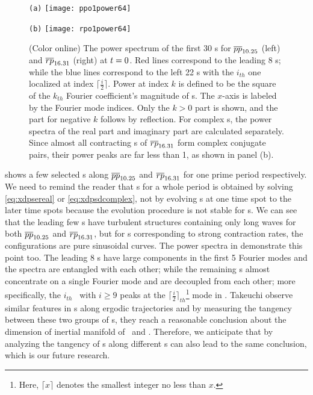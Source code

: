 \documentclass[final,leqno,onefignum,onetabnum]{siamltexmm}
\begin{document}
\begin{figure}[h]
  \centering
  \begin{minipage}{.47\textwidth}
    \centering \small{\texttt{(a)}}
    \texttt{[image: ppo1power64]}
  \end{minipage}
  \begin{minipage}{.47\textwidth}
    \centering \small{\texttt{(b)}}
    \texttt{[image: rpo1power64]}
  \end{minipage}
  \caption{(Color online)
    The power spectrum of the first 30 \Fv s for ${\overline{pp}}_{10.25}$
    (left) and ${\overline{rp}}_{16.31}$ (right)
    at $t=0$. Red lines correspond to the leading 8 \Fv s; while
    the blue lines correspond to the left 22 \Fv s with the $i_{th}$ one
    {localized at index $\lceil \frac{i}{2} \rceil$.
    Power at index $k$ is defined to be the square of the $k_{th}$
    Fourier coefficient's magnitude
    of \Fv s}.
    The $x$-axis is
    labeled by the Fourier mode indices.
    Only the $k>0$ part is shown, and the part for
    negative $k$ follows by reflection. For complex \Fv s, the
    power spectra of the real part and imaginary part are calculated
    separately. Since almost all contracting \Fv s of ${\overline{rp}}_{16.31}$
    form complex conjugate pairs, their power peaks are far less than 1,
    {as shown in panel (b)}.
  }
  \label{fig:FVpower}
\end{figure}
 shows a few selected \Fv s along ${\overline{pp}}_{10.25}$
and ${\overline{rp}}_{16.31}$ for one prime period respectively. We need to
remind the reader that \Fv s for a whole period is obtained by solving
\eqref{eq:xdpsereal} or \eqref{eq:xdpsdcomplex}, not by evolving
\Fv s at one time spot to the later time spots because the evolution
procedure is not stable  for \Fv s. We can see that the leading
few \Fv s have turbulent structures containing only long waves
for both ${\overline{pp}}_{10.25}$ and ${\overline{rp}}_{16.31}$, but for
\Fv s corresponding to strong contraction rates, the configurations
are pure sinusoidal curves. The power spectra in 
demonstrate this point too. The leading 8 \Fv s have large components in
the first 5 Fourier modes and the spectra are entangled with each other;
while the remaining \Fv s almost concentrate
on a single Fourier mode and are decoupled from each other;
more specifically, the $i_{th}$ \Fv\ with $i\ge 9$
peaks at the $\lceil \frac{i}{2} \rceil_{th}$\footnote{{
Here, $\lceil x \rceil$ denotes the smallest integer no less than $x$. }}
mode in .
Takeuchi {\etal} observe similar
features in \cLv s along ergodic
trajectories and by measuring the tangency between these two groups of
\cLv s, they reach a reasonable conclusion about the dimension of
inertial manifold of \KSe\ and \cGLe.
Therefore, we anticipate that by analyzing the tangency of \Fv s along
different \po s can also lead to the same conclusion, which is our
future research.
\end{document}
